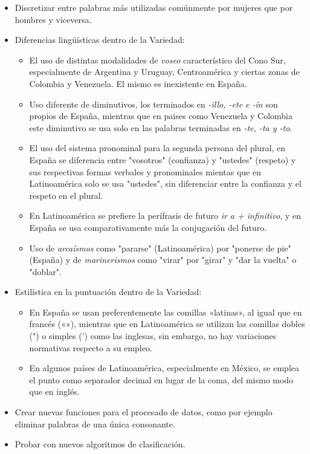 \documentclass[11pt,a4paper]{article}
\begin{document}
\begin{itemize}
  \item Discretizar entre palabras más utilizadas comúnmente por mujeres que por hombres y viceversa.
  \item Diferencias lingüísticas dentro de la Variedad:
        \begin{itemize}
        \item El uso de distintas modalidades de {\em voseo} característico del Cono Sur, especialmente de Argentina y Uruguay, Centroamérica y ciertas zonas de Colombia y Venezuela. El mismo es inexistente en España.
        \item Uso diferente de diminutivos, los terminados en {\em -illo, -ete e -ín} son propios de España, mientras que en paises como Venezuela y Colombia este diminutivo se usa solo en las palabras terminadas en {\em -te, -ta y -to}. 
        \item El uso del sistema pronominal para la segunda persona del plural, en España se diferencia entre "vosotros" (confianza) y "ustedes" (respeto) y sus respectivas formas verbales y pronominales mientas que en Latinoamérica solo se usa "ustedes", sin diferenciar entre la confianza y el respeto en el plural.
        \item En Latinoamérica se prefiere la perífrasis de futuro {\em ir a + infinitivo}, y en España se usa comparativamente más la conjugación del futuro.
        \item Uso de {\em arcaísmos} como "pararse" (Latinoamérica) por "ponerse de pie" (España) y de {\em marinerismos} como "virar" por "girar" y "dar la vuelta" o "doblar".
        \end{itemize}
  \item Estilística en la puntuación dentro de la Variedad:
        \begin{itemize}
        \item En España se usan preferentemente las comillas «latinas», al igual que en francés («»), mientras que en Latinoamérica se utilizan las comillas dobles (") o simples (') como las inglesas, sin embargo, no hay variaciones normativas respecto a su empleo.
        \item En algunos países de Latinoamérica, especialmente en México, se emplea el punto como separador decimal en lugar de la coma, del mismo modo que en inglés.
        \end{itemize}
  \item Crear nuevas funciones para el procesado de datos, como por ejemplo eliminar palabras de una única consonante.
  \item Probar con nuevos algoritmos de clasificación.
 \end{itemize}
 
\end{document}

